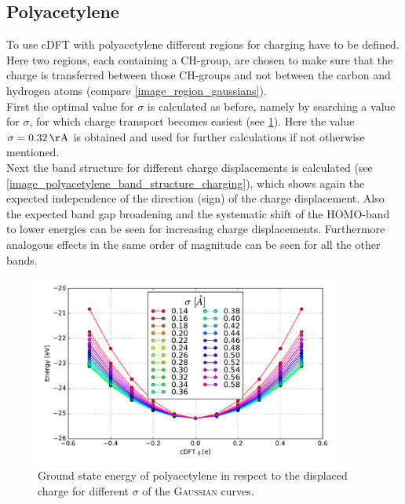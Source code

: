 \subsection{Polyacetylene}
To use cDFT with polyacetylene different regions for charging have to be defined. Here two regions, each containing a CH-group, are chosen to make sure that the charge is transferred between those CH-groups and not between the carbon and hydrogen atoms (compare \cref{image_region_gaussians}).\\
First the optimal value for $\sigma$ is calculated as before, namely by searching a value for $\sigma$, for which charge transport becomes easiest (see \cref{image_sigmas_polyacetylene}). Here the value $\sigma = \unit[0.32]{\AA}$ is obtained and used for further calculations if not otherwise mentioned.\\
Next the band structure for different charge displacements is calculated (see \cref{image_polyacetylene_band_structure_charging}), which shows again the expected independence of the direction (sign) of the charge displacement. Also the expected band gap broadening and the systematic shift of the HOMO-band to lower energies can be seen for increasing charge displacements. Furthermore analogous effects in the same order of magnitude can be seen for all the other bands.\\
\begin{figure}
	\centering
	\includegraphics[width = 10cm]{Images/polyacetylene/charging/sigmas}
	\caption{Ground state energy of polyacetylene in respect to the displaced charge for different $\sigma$ of the \textsc{Gaussian} curves.}
	\label{image_sigmas_polyacetylene}
\end{figure}
